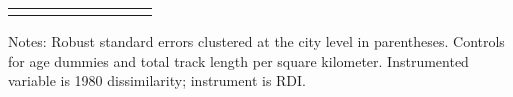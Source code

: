 \begin{table}[H]
{\begin{threeparttable}
\begin{tabular}{lcccccccc}
\bottomrule[0.5pt]                                                                               \label{tab:table2}                                                                       \end{tabular}                                                                                                    \vspace{-13pt}                                                                                           \begin{tablenotes}[flushleft]{\setlength{\itemindent}{-3pt}}          \small                                                                                                           \item Notes: Robust standard errors clustered at the city level  in  parentheses. Controls for age dummies and total track length per square kilometer. Instrumented variable is 1980 dissimilarity; instrument is RDI.           \end{tablenotes}                                                                                         \end{threeparttable}                                                                             }                                                                                                                        \end{table}
